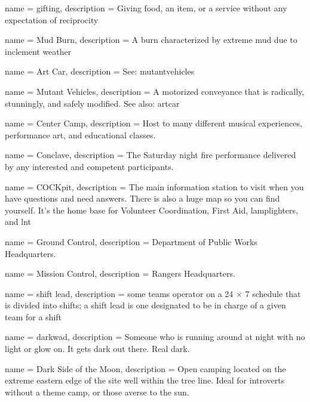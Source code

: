  {
name = {gifting},
description = {Giving food, an item, or a service without any expectation of reciprocity}
}

 {
name = {Mud Burn},
description = {A burn characterized by extreme mud due to inclement weather}
}

 {
name = {Art Car},
description = {See: \gls{mutantvehicles}}
}

 {
name = {Mutant Vehicles},
description = {A motorized conveyance that is radically, stunningly, and safely modified. See also: \gls{artcar}}
}

 {
name = {Center Camp},
description = {Host to many different musical experiences, performance art, and educational classes.}
}

 {
name = {Conclave},
description = {The Saturday night fire performance delivered by any interested and competent participants.}
}

 {
name = {COCKpit},
description = {The main information station to visit when you have questions and need answers. There is also a huge map so you can find yourself. It's the home base for Volunteer Coordination, First Aid, \gls{lamplighters}, and \gls{lnt}}
}


 {
name = {Ground Control},
description = {Department of Public Works Headquarters.}
}

 {
name = {Mission Control},
description = {Rangers Headquarters.}
}

 {
name = {shift lead},
description = {some teams operator on a 24 $\times$ 7 schedule that is divided into shifts; a shift lead is one designated to be in charge of a given team for a shift}
}


 {
name = {darkwad},
description = {Someone who is running around at night with no light or glow on. It gets dark out there. Real dark.}
}

 {
name = {Dark Side of the Moon},
description = {Open camping located on the extreme eastern edge of the site well within the tree line.  Ideal for introverts without a theme camp, or those averse to the sun.}
}

